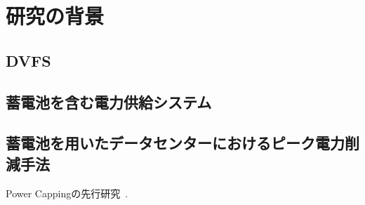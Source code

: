 \chapter{研究の背景}
\label{chap:background}



\section{DVFS}
\label{sec:dvfs}


\section{蓄電池を含む電力供給システム}
\label{sec:ups}


\section{蓄電池を用いたデータセンターにおけるピーク電力削減手法}
\label{sec:capping}

Power Cappingの先行研究~\cite{Fan:2007:PPW:1273440.1250665}.
